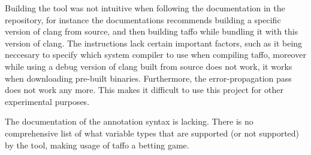 Building the tool was not intuitive when following the documentation in the repository, for instance the documentations recommends building a specific version of clang from source, and then building taffo while bundling it with this version of clang. The instructions lack certain important factors, such as it being neccesary to specify which system compiler to use when compiling taffo, moreover while using a debug version of clang built from source does not work, it works when downloading pre-built binaries.
Furthermore, the error-propagation pass does not work any more. This makes it difficult to use this project for other experimental purposes.

The documentation of the annotation syntax is lacking. There is no comprehensive list of what variable types that are supported (or not supported) by the tool, making usage of taffo a betting game.